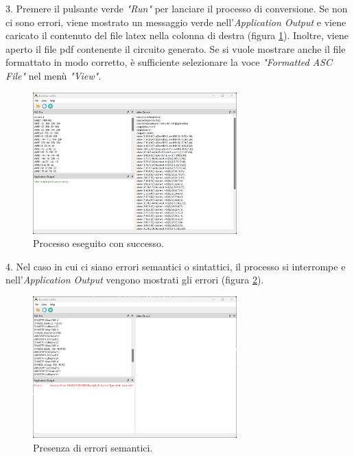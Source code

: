 3. Premere il pulsante verde \textit{"Run"} per lanciare il processo di conversione. Se non ci sono errori, viene mostrato un messaggio verde nell'\textit{Application Output} e viene caricato il contenuto del file latex nella colonna di destra (figura \ref{fig:punto_3}). Inoltre, viene aperto il file pdf contenente il circuito generato. Se si vuole mostrare anche il file formattato in modo corretto, è sufficiente selezionare la voce \textit{"Formatted ASC File"} nel menù \textit{"View"}.
\begin{figure}[h!]
	\centering
	\includegraphics[width=0.7\textwidth]{./ImageFiles/run con successo.png}
	\caption{Processo eseguito con successo.}
	\label{fig:punto_3}
\end{figure}

4. Nel caso in cui ci siano errori semantici o sintattici, il processo si interrompe e nell'\textit{Application Output} vengono mostrati gli errori (figura \ref{fig:punto_4}).

\begin{figure}[h!]
	\centering
	\includegraphics[width=0.7\textwidth]{./ImageFiles/semantic error.png}
	\caption{Presenza di errori semantici.}
	\label{fig:punto_4}
\end{figure}






